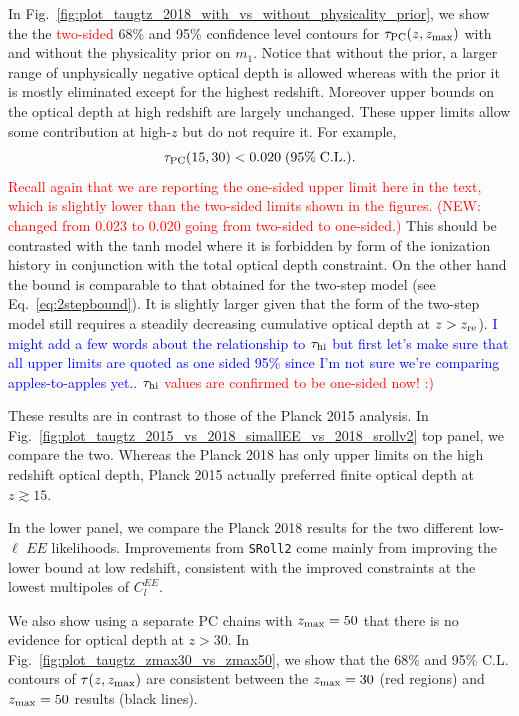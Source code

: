 \documentclass[prd,twocolumn,amsmath,amssymb,floatfix,superscriptaddress,nofootinbib]{revtex4-1}
\newcommand{\zmax}{z_{\rm max}}
\newcommand{\beq}{\begin{equation}}
\newcommand{\eeq}{\end{equation}}
\newcommand{\wh}[1]{\textcolor{blue}{#1}}
\newcommand{\ch}[1]{\textcolor{red}{#1}}
\begin{document}
{In Fig.~\ref{fig:plot_taugtz_2018_with_vs_without_physicality_prior}, we show the 
the \ch{two-sided} 68\% and 95\% confidence level contours for  $\tau_{\rm PC}(z,z_{\rm max})$ with and without the physicality prior on $m_1$.  Notice that without the prior, a larger range of unphysically negative optical depth is allowed whereas with the prior it is mostly eliminated except for the highest redshift.  Moreover upper bounds on the optical depth at high 
redshift are largely unchanged.   These upper limits allow some contribution at high-$z$ but do not require it.   For example,
\ch{
\beq
\tau_{\rm PC}(15, 30) < 0.020 \; (95\%\; \mathrm{C.L.}).
\label{eq:tauPC15}
\eeq
}
\ch{Recall again that we are reporting the one-sided upper limit here in the text, which is slightly lower than the two-sided limits shown in the figures.}
%
\ch{(NEW: changed from 0.023 to 0.020 going from two-sided to one-sided.)}
This should be contrasted with the tanh model 
 where it is  forbidden by form of the ionization history in conjunction with the total optical depth constraint.  
 On the other hand the bound is comparable to that obtained for the two-step model (see Eq.~\ref{eq:2stepbound}).  It is slightly larger given that the form of the two-step model still requires a steadily decreasing cumulative optical depth at $z>z_{\rm re}$).
 \wh{I might add a few words about the relationship to $\tau_{\rm hi}$ but first let's make sure that all upper limits are quoted as one sided 95\% since I'm not sure we're comparing apples-to-apples yet..} \ch{$\tau_{\rm hi}$ values are confirmed to be one-sided now! :) }
 
 
These results are in contrast to those of the Planck 2015 analysis. 
In Fig.~\ref{fig:plot_taugtz_2015_vs_2018_simallEE_vs_2018_srollv2} top panel, we compare
the two.  Whereas the Planck 2018 has only upper limits on the high redshift optical depth, Planck 2015 actually preferred
finite optical depth at $z\gtrsim 15$.

In the lower panel, we compare the Planck 2018 results for the two different low-$\ell$ $EE$ likelihoods.  Improvements from \texttt{SRoll2} come mainly from improving the lower bound at low redshift, consistent with the improved constraints at the lowest multipoles of $C_l^{EE}$.

We also show using a separate PC chains with $\zmax = 50$ that there is no evidence for optical depth at $z>30$. 
In Fig.~\ref{fig:plot_taugtz_zmax30_vs_zmax50}, we show that the 68\% and 95\% C.L. contours of $\tau(z, \zmax)$ are consistent between the $\zmax = 30$ (red regions) and $\zmax = 50$ results (black lines).

}
\end{document}
